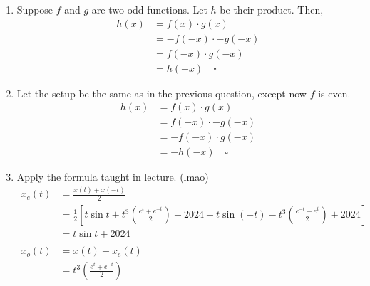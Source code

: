 \documentclass[12pt]{article}
\begin{document}
\begin{enumerate}
\begin{enumerate}
                  \item Suppose $f$ and $g$ are two odd functions.
                        Let $h$ be their product. Then,
                        \begin{align*}
                              h(x) & = f(x) \cdot g(x)     \\
                                   & = -f(-x) \cdot -g(-x) \\
                                   & = f(-x) \cdot g(-x)   \\
                                   & = h(-x)\quad\square
                        \end{align*}
                  \item Let the setup be the same as in the previous question, except now $f$ is even.
                        \begin{align*}
                              h(x) & = f(x) \cdot g(x)    \\
                                   & = f(-x) \cdot -g(-x) \\
                                   & = -f(-x) \cdot g(-x) \\
                                   & = -h(-x)\quad\square
                        \end{align*}
                  \item Apply the formula taught in lecture. (lmao)
                        \begin{align*}
                              x_e(t) & = \frac{x(t)+x(-t)}{2}                                                                                                                  \\
                                     & = \frac{1}{2} \left[t \sin t + t^3 \left(\frac{e^t+e^{-t}}{2}\right)+2024-t \sin (-t)-t^3 \left(\frac{e^{-t}+e^t}{2}\right)+2024\right] \\
                                     & = \boxed{t \sin t + 2024}                                                                                                               \\
                              \\
                              x_o(t) & = x(t) - x_e(t)                                                                                                                         \\
                                     & =\boxed{t^3 \left(\frac{e^t+e^{-t}}{2}\right)}
                        \end{align*}

\end{enumerate}
\end{enumerate}
\end{document}
